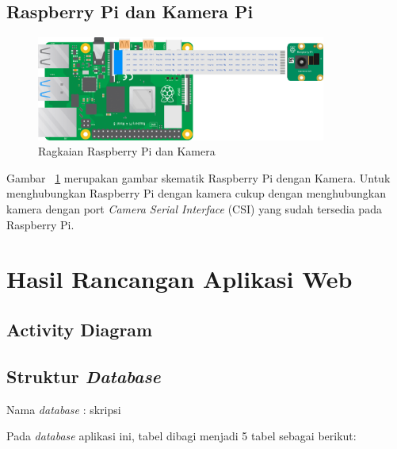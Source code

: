 \subsection{Raspberry Pi dan Kamera Pi}
\begin{figure} [H]
    \includegraphics[width=0.85\textwidth, center]{images/skematik-kamera.png}
    \caption{Ragkaian Raspberry Pi dan Kamera}
    \label{fig:skematikKamera}
\end{figure}

Gambar ~\ref{fig:skematikKamera} merupakan gambar skematik Raspberry Pi dengan Kamera. Untuk menghubungkan Raspberry Pi dengan kamera cukup dengan menghubungkan kamera dengan port \textit{Camera Serial Interface} (CSI) yang sudah tersedia pada Raspberry Pi.


\section{Hasil Rancangan Aplikasi Web}

\subsection{Activity Diagram}

\subsection{Struktur \textit{Database}}
Nama \textit{database} : skripsi

Pada \textit{database} aplikasi ini, tabel dibagi menjadi 5 tabel sebagai berikut:

